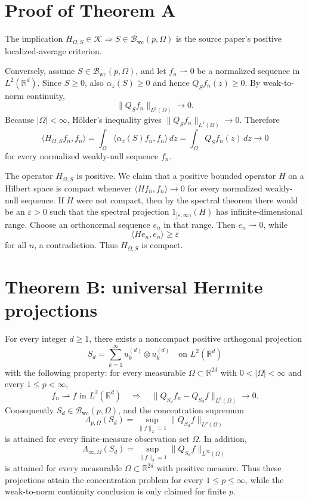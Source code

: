 \documentclass[11pt]{amsart}
\newcommand{\R}{\mathbb R}
\newcommand{\cB}{\mathcal B}
\newcommand{\cK}{\mathcal K}
\newcommand{\wc}{\mathrm{wc}}
\newcommand{\dd}{\,d}
\begin{document}
\section*{Proof of Theorem A}

The implication \(H_{\Omega,S}\in\cK\Rightarrow S\in\cB_{\wc}(p,\Omega)\) is the source paper's positive localized-average criterion.

Conversely, assume \(S\in\cB_{\wc}(p,\Omega)\), and let \(f_n\rightharpoonup0\) be a normalized sequence in \(L^2(\R^d)\).  Since \(S\ge0\), also \(\alpha_z(S)\ge0\) and hence \(Q_Sf_n(z)\ge0\).  By weak-to-norm continuity,
\[
\|Q_Sf_n\|_{L^p(\Omega)}\to0.
\]
Because \(|\Omega|<\infty\), Hölder's inequality gives \(\|Q_Sf_n\|_{L^1(\Omega)}\to0\).  Therefore
\[
\langle H_{\Omega,S}f_n,f_n\rangle
=\int_\Omega \langle \alpha_z(S)f_n,f_n\rangle\dd z
=\int_\Omega Q_Sf_n(z)\dd z
\longrightarrow0
\]
for every normalized weakly-null sequence \(f_n\).

The operator \(H_{\Omega,S}\) is positive.  We claim that a positive bounded operator \(H\) on a Hilbert space is compact whenever \(\langle Hf_n,f_n\rangle\to0\) for every normalized weakly-null sequence.  If \(H\) were not compact, then by the spectral theorem there would be an \(\varepsilon>0\) such that the spectral projection \(1_{[\varepsilon,\infty)}(H)\) has infinite-dimensional range.  Choose an orthonormal sequence \(e_n\) in that range.  Then \(e_n\rightharpoonup0\), while
\[
\langle He_n,e_n\rangle\ge\varepsilon
\]
for all \(n\), a contradiction.  Thus \(H_{\Omega,S}\) is compact.

\section*{Theorem B: universal Hermite projections}

For every integer \(d\ge1\), there exists a noncompact positive orthogonal projection
\[
S_d=\sum_{k=1}^\infty u_k^{(d)}\otimes u_k^{(d)}
\quad\text{on }L^2(\R^d)
\]
with the following property: for every measurable \(\Omega\subset\R^{2d}\) with \(0<|\Omega|<\infty\) and every \(1\le p<\infty\),
\[
f_n\rightharpoonup f \text{ in } L^2(\R^d)
\quad\Longrightarrow\quad
\|Q_{S_d}f_n-Q_{S_d}f\|_{L^p(\Omega)}\to0 .
\]
Consequently \(S_d\in\cB_{\wc}(p,\Omega)\), and the concentration supremum
\[
\Lambda_{p,\Omega}(S_d)=\sup_{\|f\|_2=1}\|Q_{S_d}f\|_{L^p(\Omega)}
\]
is attained for every finite-measure observation set \(\Omega\).  In addition,
\[
\Lambda_{\infty,\Omega}(S_d)=\sup_{\|f\|_2=1}\|Q_{S_d}f\|_{L^\infty(\Omega)}
\]
is attained for every measurable \(\Omega\subset\R^{2d}\) with positive measure.  Thus these projections attain the concentration problem for every \(1\le p\le\infty\), while the weak-to-norm continuity conclusion is only claimed for finite \(p\).
\end{document}

